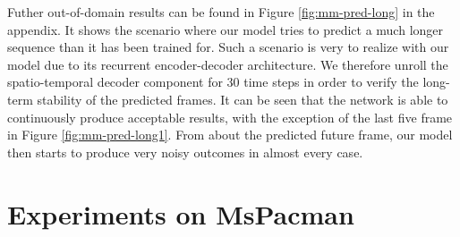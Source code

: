 Futher out-of-domain results can be found in Figure \ref{fig:mm-pred-long} in the appendix. It shows the scenario where our model tries to predict a much longer sequence than it has been trained for. Such a scenario is very to realize with our model due to its recurrent encoder-decoder architecture. We therefore unroll the spatio-temporal decoder component for \num{30} time steps in order to verify the long-term stability of the predicted frames. It can be seen that the network is able to continuously produce acceptable results, with the exception of the last five frame in Figure \ref{fig:mm-pred-long1}. From about the  predicted future frame, our model then starts to produce very noisy outcomes in almost every case.


\section{Experiments on MsPacman}















